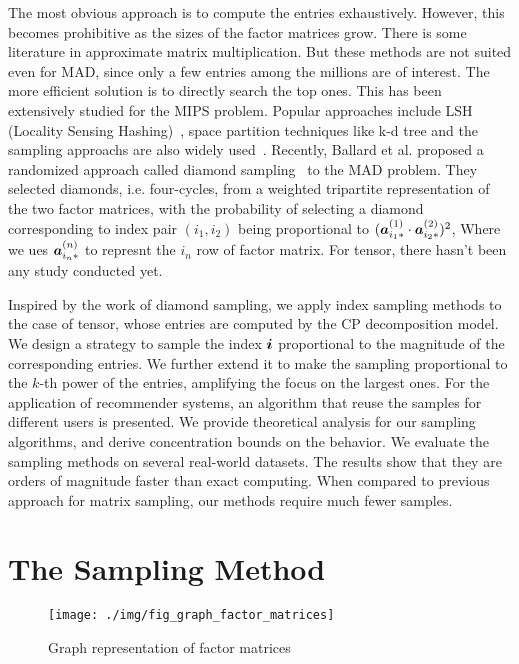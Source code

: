 \documentclass[letterpaper]{article}
\newcommand{\V}[1]{{\boldsymbol{{\MakeLowercase{#1}}}}}
\newcommand{\RowVecA}[1]{\V{a}^{(#1)}_{i_#1*}}
\begin{document}
The most obvious approach is to compute the entries exhaustively. 
However, this becomes prohibitive as the sizes of the factor matrices grow. 
There is some literature in approximate matrix multiplication. 
But these methods are not suited even for MAD, 
since only a few entries among the millions are of interest. 
The more efficient solution is to directly search the top ones. 
This has been extensively studied for the MIPS problem.
Popular approaches include LSH (Locality Sensing Hashing)~\cite{Andoni08,ALSH14},
space partition techniques like k-d tree 
and the sampling approachs are also widely used~\cite{Drineas2006,John15}.
Recently, Ballard et al. proposed a randomized approach called diamond sampling~\cite{BaPiKoSe15} to the MAD problem. 
They selected diamonds, i.e. four-cycles, from a weighted tripartite representation of the two factor matrices, 
with the probability of selecting a diamond corresponding to index pair $(i_1,i_2)$ 
being proportional to $(\RowVecA{1}\cdot\RowVecA{2})^2$,
Where we ues $\RowVecA{n}$ to represnt the $i_n$ row of factor matrix.
For tensor, there hasn't been any study conducted yet.

Inspired by the work of diamond sampling,
we apply index sampling methods to the case of tensor, 
whose entries are computed by the CP decomposition model. 
We design a strategy to sample the index $\V{i}$ proportional to the magnitude of the corresponding entries. 
We further extend it to make the sampling proportional to the $k$-th power of the entries,
amplifying the focus on the largest ones. 
For the application of recommender systems, 
an algorithm that reuse the samples for different users is presented. 
We provide theoretical analysis for our sampling algorithms, 
and derive concentration bounds on the behavior. 
We evaluate the sampling methods on several real-world datasets. 
The results show that they are orders of magnitude faster than exact computing. 
When compared to previous approach for matrix sampling, our methods require much fewer samples.

\section{The Sampling Method}
\begin{figure}[!ht]
  \centering
  \texttt{[image: ./img/fig\_graph\_factor\_matrices]}\\
  \caption{Graph representation of factor matrices}
  \label{fig:GraphMatrices}
\end{figure}
\end{document}
